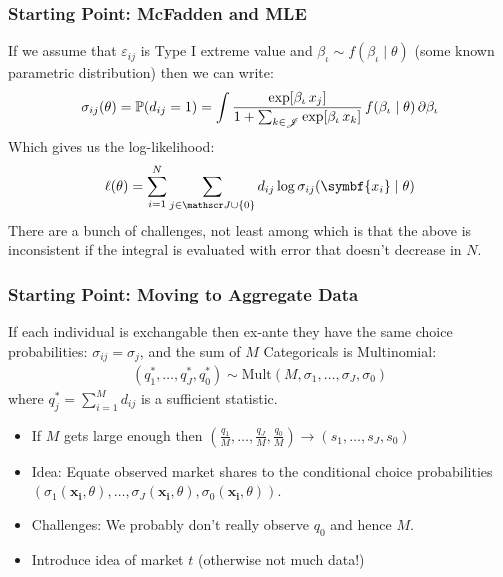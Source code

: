 \documentclass[aspectratio=169,10pt]{beamer}
\begin{document}
\begin{frame}
\frametitle{Starting Point: McFadden and MLE}
If we assume that $\varepsilon_{ij}$ is Type I extreme value and $\beta_{\iota} \sim f(\beta_{\iota} \mid \theta)$ (some known parametric distribution) then we can write:
\begin{align*}
\sigma_{ij}(\theta)= \mathbb{P}(d_{ij}=1) = \int \frac{\exp[\beta_{\iota} \, x_j]}{1+\sum_{k \in \mathscr{J}} \exp[\beta_{\iota} \, x_k]}\, f(\beta_{\iota} \mid \theta)\, \partial \beta_{\iota}
\end{align*}
Which gives us the log-likelihood:
 \begin{align*}
 \ell(\theta) = \sum_{i=1}^N \sum_{j \in \calJ \cup \{0\}} d_{ij} \log \sigma_{ij}(\symbf{x_i} \mid \theta)
 \end{align*}
 There are a bunch of challenges, not least among which is that the above is \alert{inconsistent} if the integral is evaluated with error that doesn't decrease in $N$.
\end{frame}







\begin{frame}
\frametitle{Starting Point: Moving to Aggregate Data}
If each individual is \alert{exchangable} then ex-ante they have the same choice probabilities: $\sigma_{ij}=\sigma_j$, and the sum of $M$ Categoricals is Multinomial:
\begin{align*}
(q_{1}^{*},\ldots,q_{J}^{*},q_{0}^{*}) \sim \text{Mult} (M, \sigma_{1},\ldots,\sigma_{J},\sigma_{0} ) 
\end{align*}
where $q_{j}^{*}=\sum_{i=1}^M d_{ij}$ is a \alert{sufficient statistic}. 
\begin{itemize}
\item If $M$ gets large enough then $(\frac{q_1}{M},\ldots,\frac{q_J}{M},\frac{q_0}{M})\rightarrow (s_1,\ldots,s_J,s_0)$
 \item Idea: Equate observed market shares to the conditional choice probabilities $(\sigma_1(\symbf{x_i},\theta),\ldots,\sigma_J(\symbf{x_i},\theta),\sigma_0(\symbf{x_i},\theta))$.
\item  Challenges: We probably don't really observe $q_0$ and hence $M$.
\item Introduce idea of market $t$ (otherwise not much data!)
\end{itemize}
\end{frame}
\end{document}
